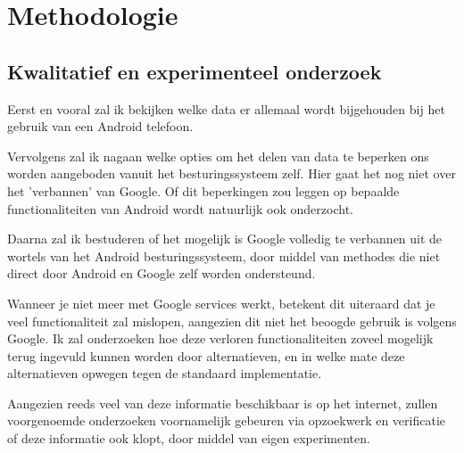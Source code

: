 \section{Methodologie}
\label{sec:methodologie}


\subsection{{Kwalitatief en experimenteel onderzoek}}


Eerst en vooral zal ik bekijken welke data er allemaal wordt bijgehouden bij het gebruik van een Android telefoon.

\vspace{2mm}

Vervolgens zal ik nagaan welke opties om het delen van data te beperken ons worden aangeboden vanuit het besturingssysteem zelf. Hier gaat het nog niet over het 'verbannen' van Google. Of dit beperkingen zou leggen op bepaalde functionaliteiten van Android wordt natuurlijk ook onderzocht.

\vspace{2mm}

Daarna zal ik bestuderen of het mogelijk is Google volledig te verbannen uit de wortels van het Android besturingssysteem, door middel van methodes die niet direct door Android en Google zelf worden ondersteund.

\vspace{2mm}

Wanneer je niet meer met Google services werkt, betekent dit uiteraard dat je veel functionaliteit zal mislopen, aangezien dit niet het beoogde gebruik is volgens Google. Ik zal onderzoeken hoe deze verloren functionaliteiten zoveel mogelijk terug ingevuld kunnen worden door alternatieven, en in welke mate deze alternatieven opwegen tegen de standaard implementatie.

\vspace{2mm}

Aangezien reeds veel van deze informatie beschikbaar is op het internet, zullen voorgenoemde onderzoeken voornamelijk gebeuren via opzoekwerk en verificatie of deze informatie ook klopt, door middel van eigen experimenten.

